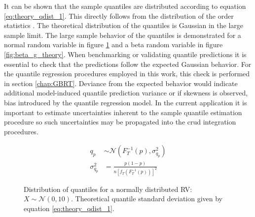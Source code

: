 It can be shown that the sample quantiles are distributed according to equation \ref{eq:theory_qdist_1}.  This directly follows from the distribution of the order statistics \cite{mosteller1946}.  The theoretical distribution of the quantiles is Gaussian in the large sample limit.  The large sample behavior of the quantiles is demonstrated for a normal random variable in figure \ref{fig:normal_q_theory} and a beta random variable in figure \ref{fig:beta_g_theory}.  When benchmarking or validating quantile predictions it is essential to check that the predictions follow the expected Gaussian behavior.  For the quantile regression procedures employed in this work, this check is performed in section \ref{chap:GBRT}.  Deviance from the expected behavior would indicate additional model-induced quantile prediction variance or if skewness is observed, bias introduced by the quantile regression model.  In the current application it is important to estimate uncertainties inherent to the sample quantile estimation procedure so such uncertainties may be propagated into the crud integration procedures.

\begin{align}
    q_p &\sim \mathcal N \left( F_T^{-1}(p), \sigma^2_{q_p} \right) \nonumber \\
    \sigma^2_{q_p} &= \frac{p(1 - p)}{n[f_T(F_T^{-1}(p))]^2}
    \label{eq:theory_qdist_1}
\end{align}


\begin{figure}[H]%
    \centering
    \qquad
    \qquad
    \qquad
    \qquad
    \caption[Distribution of quantiles for a normally distributed RV.]{Distribution of quantiles for a normally distributed RV: $X \sim \mathcal{N}(0, 10)$.  Theoretical quantile standard deviation given by equation \ref{eq:theory_qdist_1}.}%
    \label{fig:normal_q_theory}%
\end{figure}

